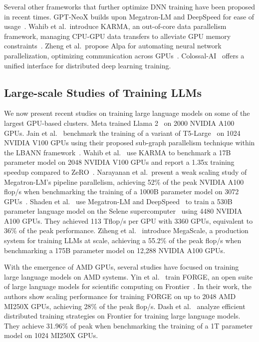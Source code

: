 Several other frameworks that further optimize DNN training have been proposed
in recent times. GPT-NeoX builds upon Megatron-LM and
DeepSpeed for ease of usage~\cite{gpt-neox-library}.
Wahib et al.~introduce KARMA, 
an out-of-core data parallelism framework, managing CPU-GPU data transfers to
alleviate GPU memory constraints~\cite{wahib2020scaling-sc}.
Zheng et al.~propose Alpa for 
automating neural network parallelization, optimizing communication across GPUs~\cite{alpa}.
Colossal-AI~\cite{colossalai2023unified} offers a unified interface for
distributed deep learning training.

\subsection{Large-scale Studies of Training LLMs}
\label{sec:ls-studies}

We now present recent studies on training large language models on some of the
largest GPU-based clusters.  Meta trained Llama 2~\cite{touvron2023llama} on
2000 NVIDIA A100 GPUs.  Jain et al.~\cite{super2021jain} benchmark the training
of a variant of T5-Large~\cite{t5-transformer} on 1024 NVIDIA V100 GPUs using
their proposed sub-graph parallelism technique within the LBANN
framework~\cite{essen2015lbann}.  Wahib et al.~\cite{wahib2020scaling-sc} use
KARMA to benchmark a 17B parameter model on 2048 NVIDIA V100 GPUs and report a
1.35x training speedup compared to ZeRO~\cite{sc2020zero}. Narayanan et
al.~present a weak scaling study of Megatron-LM's pipeline parallelism,
achieving 52\% of the peak NVIDIA A100 flop/s when benchmarking the training of
a 1000B parameter model on 3072 GPUs~\cite{megatronlm-2}. Shaden et
al.~\cite{megatron-turing-nlg-530b} use Megatron-LM and
DeepSpeed~\cite{deepspeed-extreme-3d} to train a 530B parameter language model
on the Selene supercomputer~\cite{selene} using 4480 NVIDIA A100 GPUs. They
achieved 113 Tflop/s per GPU with 3360 GPUs, equivalent to 36\% of the peak
performance. Ziheng et al.~\cite{jiang2024megascale} introduce MegaScale, a
production system for training LLMs at scale, achieving a 55.2\% of the peak
flop/s when benchmarking a 175B parameter model on 12,288 NVIDIA A100 GPUs.

With the emergence of AMD GPUs, several studies have focused on training large
language models on AMD systems. Yin et al.~\cite{yin2023forge} train FORGE, an
open suite of large language models for scientific computing on
Frontier~\cite{frontier2023}. In their work, the authors show scaling
performance for training FORGE on up to 2048 AMD MI250X GPUs, achieving 28\% of
the peak flop/s.  Dash et al.~\cite{dash2023optimizing} analyze efficient
distributed training strategies on Frontier for training large language models.
They achieve 31.96\% of peak when benchmarking the training of
a 1T parameter model on 1024 MI250X GPUs.

